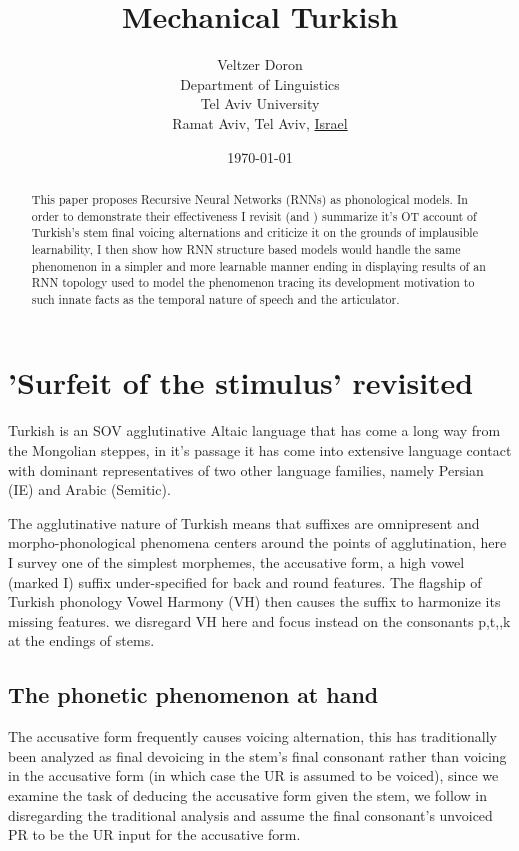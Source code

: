 \documentclass[a4paper,12pt]{article}
\title{Mechanical Turkish}
\author{ Veltzer Doron\\
Department of Linguistics\\
Tel Aviv University\\
Ramat Aviv, Tel Aviv, \underline{Israel} }
\date{\today}
\begin{document}
\maketitle

\begin{abstract}
This paper proposes Recursive Neural Networks (RNNs) as phonological models. In order to demonstrate
their effectiveness I revisit \cite{becker_phonological_2009} (and \cite{becker_surfeit_2011})
summarize it's OT account of Turkish's stem final voicing alternations and criticize it on the
grounds of implausible learnability, I then show how RNN structure based models would handle the
same phenomenon in a simpler and more learnable manner ending in displaying results of an RNN topology
used to model the phenomenon tracing its development motivation to such innate facts as the temporal
nature of speech and the articulator.
\end{abstract}

\pagebreak
\tableofcontents

\pagebreak
\section{'Surfeit of the stimulus' revisited}

Turkish is an SOV agglutinative Altaic language that has come a long way from the Mongolian steppes,
in it's passage it has come into extensive language contact with dominant representatives of two
other language families, namely Persian (IE) and Arabic (Semitic).

The agglutinative nature of Turkish means that suffixes are omnipresent and morpho-phonological
phenomena centers around the points of agglutination, here I survey one of the simplest morphemes,
the accusative form, a high vowel (marked I) suffix under-specified for back and round features. The
flagship of Turkish phonology Vowel Harmony (VH) then causes the suffix to harmonize its missing
features. we disregard VH here and focus instead on the consonants p,t,,k at the
endings of stems.

\subsection{The phonetic phenomenon at hand}

The accusative form frequently causes voicing alternation, this has traditionally been analyzed as
final devoicing in the stem's final consonant rather than voicing in the accusative form (in which
case the UR is assumed to be voiced), since we examine the task of deducing the accusative form
given the stem, we follow \cite{becker_surfeit_2011} in disregarding the traditional analysis and
assume the final consonant's unvoiced PR to be the UR input for the accusative form.
\end{document}
